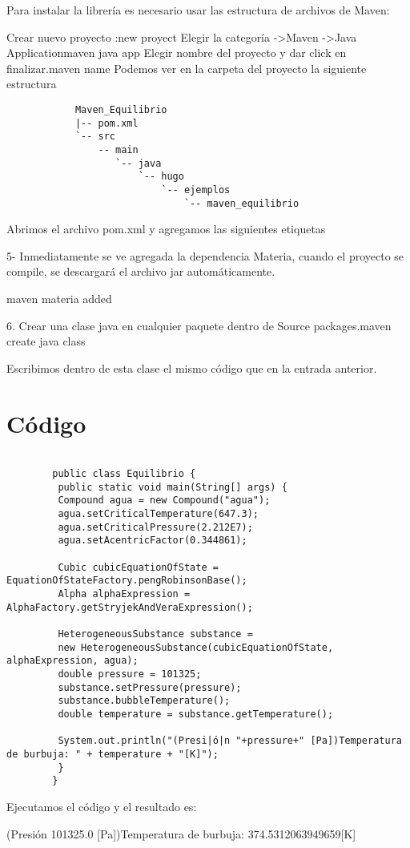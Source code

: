 	Para instalar la librería es necesario usar las estructura de archivos de Maven:
	
		    Crear nuevo proyecto :new proyect
		     Elegir la categoría ->Maven ->Java Applicationmaven java app
		    Elegir nombre del proyecto y dar click en finalizar.maven name
		    Podemos ver en la carpeta del proyecto la siguiente estructura
		\begin{verbatim}
		    Maven_Equilibrio
		    |-- pom.xml
		    `-- src
		        -- main
		           `-- java
		               `-- hugo
		                   `-- ejemplos
		                       `-- maven_equilibrio
		\end{verbatim}
		Abrimos el archivo pom.xml y agregamos las siguientes etiquetas


		


		5- Inmediatamente se ve agregada la dependencia Materia, cuando el proyecto se compile, se descargará el archivo jar automáticamente.

		maven materia added

		6.  Crear una clase java en cualquier paquete dentro de Source packages.maven create java class

		Escribimos dentro de esta clase el mismo código que en la entrada anterior.

	\section{Código}
		\begin{lstlisting}
			
		public class Equilibrio {
		 public static void main(String[] args) {
		 Compound agua = new Compound("agua");
		 agua.setCriticalTemperature(647.3);
		 agua.setCriticalPressure(2.212E7);
		 agua.setAcentricFactor(0.344861);
		 
		 Cubic cubicEquationOfState = EquationOfStateFactory.pengRobinsonBase();
		 Alpha alphaExpression = AlphaFactory.getStryjekAndVeraExpression();
		 
		 HeterogeneousSubstance substance =
		 new HeterogeneousSubstance(cubicEquationOfState, alphaExpression, agua);
		 double pressure = 101325;
		 substance.setPressure(pressure);
		 substance.bubbleTemperature();
		 double temperature = substance.getTemperature();
		 
		 System.out.println("(Presi|ó|n "+pressure+" [Pa])Temperatura de burbuja: " + temperature + "[K]");
		 }
		}

		\end{lstlisting}
		Ejecutamos el código y el resultado es:

		(Presión 101325.0 [Pa])Temperatura de burbuja: 374.5312063949659[K]